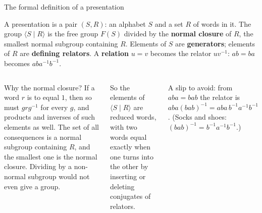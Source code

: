\documentclass[aspectratio=169,10pt]{beamer}
\newcommand{\inv}{^{-1}}
\begin{document}
\begin{frame}{The formal definition of a presentation}
\begin{defbox}
A presentation is a pair $(S,R)$: an alphabet $S$ and a set $R$ of words in it. The group $\langle S\mid R\rangle$ is the free group $F(S)$ divided by the \textbf{normal closure} of $R$, the smallest normal subgroup containing $R$. Elements of $S$ are \textbf{generators}; elements of $R$ are \textbf{defining relators}. A \textbf{relation} $u=v$ becomes the relator $uv\inv$: $ab=ba$ becomes $aba\inv b\inv$.
\end{defbox}
\begin{columns}[T]
\centering\scalebox{0.72}{\figpres}
\begin{whybox}
Why the normal closure? If a word $r$ is to equal $1$, then so must $grg\inv$ for every $g$, and products and inverses of such elements as well. The set of all consequences is a normal subgroup containing $R$, and the smallest one is the normal closure. Dividing by a non-normal subgroup would not even give a group.
\end{whybox}
So the elements of $\langle S\mid R\rangle$ are reduced words, with two words equal exactly when one turns into the other by inserting or deleting conjugates of relators.
\begin{pitbox}
A slip to avoid: from $aba=bab$ the relator is $aba(bab)\inv=aba\,b\inv a\inv b\inv$. (Socks and shoes: $(bab)\inv=b\inv a\inv b\inv$.)
\end{pitbox}
\end{columns}
\end{frame}
\end{document}
